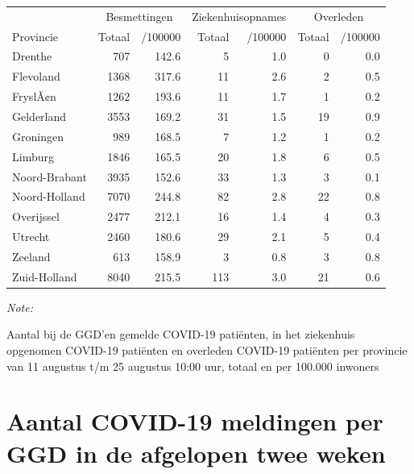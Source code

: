 \documentclass[
  english,
  man,floatsintext]{apa6}
\begin{document}
\begin{table}
\centering
\begin{threeparttable}
\begin{tabular}{lrrrrrr}
\toprule
\multicolumn{1}{c}{ } & \multicolumn{2}{c}{Besmettingen} & \multicolumn{2}{c}{Ziekenhuisopnames} & \multicolumn{2}{c}{Overleden} \\
\cmidrule(l{3pt}r{3pt}){2-3} \cmidrule(l{3pt}r{3pt}){4-5} \cmidrule(l{3pt}r{3pt}){6-7}
Provincie & Totaal & /100000 & Totaal & /100000 & Totaal & /100000\\
\midrule
Drenthe & 707 & 142.6 & 5 & 1.0 & 0 & 0.0\\
Flevoland & 1368 & 317.6 & 11 & 2.6 & 2 & 0.5\\
FryslÃ¢n & 1262 & 193.6 & 11 & 1.7 & 1 & 0.2\\
Gelderland & 3553 & 169.2 & 31 & 1.5 & 19 & 0.9\\
Groningen & 989 & 168.5 & 7 & 1.2 & 1 & 0.2\\
Limburg & 1846 & 165.5 & 20 & 1.8 & 6 & 0.5\\
Noord-Brabant & 3935 & 152.6 & 33 & 1.3 & 3 & 0.1\\
Noord-Holland & 7070 & 244.8 & 82 & 2.8 & 22 & 0.8\\
Overijssel & 2477 & 212.1 & 16 & 1.4 & 4 & 0.3\\
Utrecht & 2460 & 180.6 & 29 & 2.1 & 5 & 0.4\\
Zeeland & 613 & 158.9 & 3 & 0.8 & 3 & 0.8\\
Zuid-Holland & 8040 & 215.5 & 113 & 3.0 & 21 & 0.6\\
\bottomrule
\end{tabular}
\begin{tablenotes}
\item \textit{Note: } 
\item Aantal bij de GGD’en gemelde COVID-19 patiënten, in het ziekenhuis opgenomen COVID-19 patiënten en overleden COVID-19 patiënten per provincie van 11 augustus t/m 25 augustus 10:00 uur, totaal en per 100.000 inwoners
\end{tablenotes}
\end{threeparttable}
\end{table}

\newpage

\hypertarget{aantal-covid-19-meldingen-per-ggd-in-de-afgelopen-twee-weken}{%
\section{Aantal COVID-19 meldingen per GGD in de afgelopen twee weken}\label{aantal-covid-19-meldingen-per-ggd-in-de-afgelopen-twee-weken}}
\end{document}
